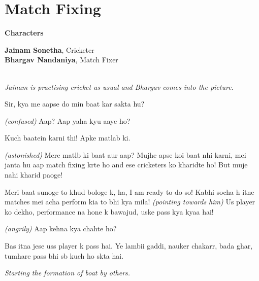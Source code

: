 \documentclass[12pt,a4paper,oneside]{memoir}
\begin{document}
\chapter*{Match Fixing}

\begin{center}

\textbf{Characters}

\vskip 1cm

\textbf{Jainam Sonetha}, Cricketer \\
\textbf{Bhargav Nandaniya}, Match Fixer \\
\vskip 1cm
\end{center}

\begin{description}[itemsep=1ex,leftmargin=1cm]
\setlength{\parskip}{5pt}

\item[] \hfill \\

\textit{Jainam is practising cricket as usual and Bhargav comes into the picture.}

\item[BHARGAV] Sir, kya me aapse do min baat kar sakta hu?

\item[JAINAM] \textit{(confused)} Aap? Aap yaha kyu aaye ho?

\item[BHARGAV] Kuch baatein karni thi! Apke matlab ki.

\item[JAINAM] \textit{(astonished)} Mere matlb ki baat aur aap? Mujhe apse koi baat nhi karni, mei janta hu aap match fixing krte ho and ese cricketers ko kharidte ho! But muje nahi kharid paoge!

\item[BHARGAV] Meri baat sunoge to khud bologe k, ha, I am ready to do so! Kabhi socha h itne matches mei acha perform kia to bhi kya mila! \textit{(pointing towards him)} Us player ko dekho, performance na hone k bawajud, uske pass kya kyaa hai!

\item[JAINAM] \textit{(angrily)} Aap kehna kya chahte ho?

\item[BHARGAV] Bas itna jese uss player k pass hai. Ye lambii gaddi, nauker chakarr, bada ghar, tumhare pass bhi sb kuch ho skta hai.

\textit{Starting the formation of boat by others.}


\end{description}
\end{document}
